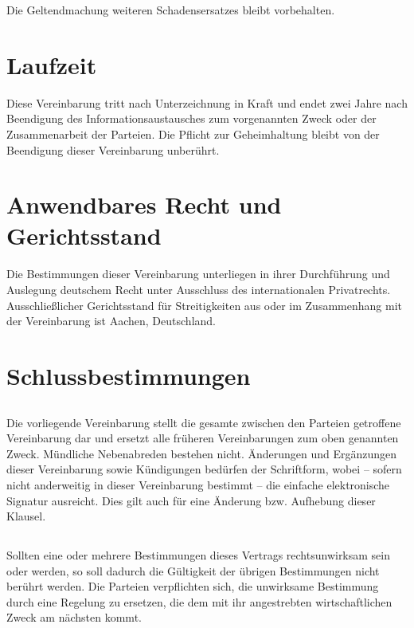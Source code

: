 \documentclass[10pt]{article}
\begin{document}
Die Geltendmachung weiteren Schadensersatzes bleibt vorbehalten. 


\section{Laufzeit}

Diese Vereinbarung tritt nach Unterzeichnung in Kraft und endet zwei Jahre nach Beendigung des Informationsaustausches zum vorgenannten Zweck oder der Zusammenarbeit der Parteien. Die Pflicht zur Geheimhaltung bleibt von der Beendigung dieser Vereinbarung unberührt. 

\section{Anwendbares Recht und Gerichtsstand}

Die Bestimmungen dieser Vereinbarung unterliegen in ihrer Durchführung und Auslegung deutschem Recht unter Ausschluss des internationalen Privatrechts. Ausschließlicher Gerichtsstand für Streitigkeiten aus oder im Zusammenhang mit der Vereinbarung ist Aachen, Deutschland.


\section{Schlussbestimmungen}

\subsection{} Die vorliegende Vereinbarung stellt die gesamte zwischen den Parteien getroffene Vereinbarung dar und ersetzt alle früheren Vereinbarungen zum oben genannten Zweck. Mündliche Nebenabreden bestehen nicht. Änderungen und Ergänzungen dieser Vereinbarung sowie Kündigungen bedürfen der Schriftform, wobei – sofern nicht anderweitig in dieser Vereinbarung bestimmt – die einfache elektronische Signatur ausreicht. Dies gilt auch für eine Änderung bzw. Aufhebung dieser Klausel.

\subsection{} Sollten eine oder mehrere Bestimmungen dieses Vertrags rechtsunwirksam sein oder werden, so soll dadurch die Gültigkeit der übrigen Bestimmungen nicht berührt werden. Die Parteien verpflichten sich, die unwirksame Bestimmung durch eine Regelung zu ersetzen, die dem mit ihr angestrebten wirtschaftlichen Zweck am nächsten kommt.
\end{document}
